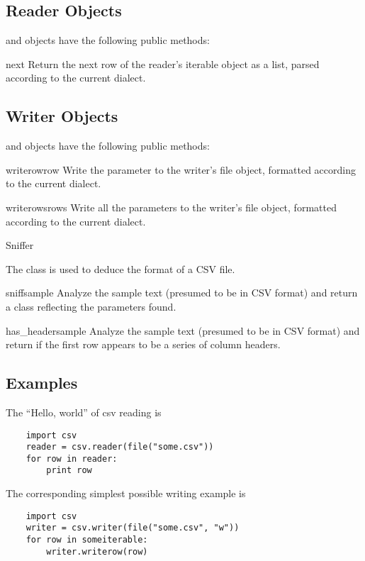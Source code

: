 \subsection{Reader Objects}

 and  objects have the following public
methods:

\begin{methoddesc}{next}{}
Return the next row of the reader's iterable object as a list, parsed
according to the current dialect.
\end{methoddesc}


\subsection{Writer Objects}

 and  objects have the following public
methods:

\begin{methoddesc}{writerow}{row}
Write the  parameter to the writer's file object, formatted
according to the current dialect.
\end{methoddesc}

\begin{methoddesc}{writerows}{rows}
Write all the  parameters to the writer's file object, formatted
according to the current dialect.
\end{methoddesc}


\begin{classdesc}{Sniffer}{}

The  class is used to deduce the format of a CSV file.

\begin{methoddesc}{sniff}{sample}
Analyze the sample text (presumed to be in CSV format) and return a
{} class reflecting the parameters found.
\end{methoddesc}

\begin{methoddesc}{has_header}{sample}
Analyze the sample text (presumed to be in CSV format) and return
{} if the first row appears to be a series of column headers.
\end{methoddesc}
\end{classdesc}

\subsection{Examples}

The ``Hello, world'' of csv reading is

\begin{verbatim}
    import csv
    reader = csv.reader(file("some.csv"))
    for row in reader:
        print row
\end{verbatim}

The corresponding simplest possible writing example is

\begin{verbatim}
    import csv
    writer = csv.writer(file("some.csv", "w"))
    for row in someiterable:
        writer.writerow(row)
\end{verbatim}
